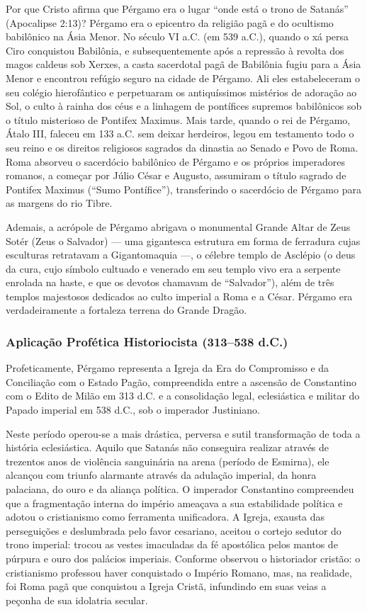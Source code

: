 \documentclass[11pt,a4paper,openany]{book}
\begin{document}
Por que Cristo afirma que Pérgamo era o lugar ``onde está o trono de Satanás'' (Apocalipse 2:13)? Pérgamo era o epicentro da religião pagã e do ocultismo babilônico na Ásia Menor. No século VI a.C. (em 539 a.C.), quando o xá persa Ciro conquistou Babilônia, e subsequentemente após a repressão à revolta dos magos caldeus sob Xerxes, a casta sacerdotal pagã de Babilônia fugiu para a Ásia Menor e encontrou refúgio seguro na cidade de Pérgamo. Ali eles estabeleceram o seu colégio hierofântico e perpetuaram os antiquíssimos mistérios de adoração ao Sol, o culto à rainha dos céus e a linhagem de pontífices supremos babilônicos sob o título misterioso de Pontifex Maximus. Mais tarde, quando o rei de Pérgamo, Átalo III, faleceu em 133 a.C. sem deixar herdeiros, legou em testamento todo o seu reino e os direitos religiosos sagrados da dinastia ao Senado e Povo de Roma. Roma absorveu o sacerdócio babilônico de Pérgamo e os próprios imperadores romanos, a começar por Júlio César e Augusto, assumiram o título sagrado de Pontifex Maximus (``Sumo Pontífice''), transferindo o sacerdócio de Pérgamo para as margens do rio Tibre.

Ademais, a acrópole de Pérgamo abrigava o monumental Grande Altar de Zeus Sotér (Zeus o Salvador) — uma gigantesca estrutura em forma de ferradura cujas esculturas retratavam a Gigantomaquia —, o célebre templo de Asclépio (o deus da cura, cujo símbolo cultuado e venerado em seu templo vivo era a serpente enrolada na haste, e que os devotos chamavam de ``Salvador''), além de três templos majestosos dedicados ao culto imperial a Roma e a César. Pérgamo era verdadeiramente a fortaleza terrena do Grande Dragão.


\subsubsection*{Aplicação Profética Historiocista (313–538 d.C.)}
Profeticamente, Pérgamo representa a Igreja da Era do Compromisso e da Conciliação com o Estado Pagão, compreendida entre a ascensão de Constantino com o Edito de Milão em 313 d.C. e a consolidação legal, eclesiástica e militar do Papado imperial em 538 d.C., sob o imperador Justiniano.

Neste período operou-se a mais drástica, perversa e sutil transformação de toda a história eclesiástica. Aquilo que Satanás não conseguira realizar através de trezentos anos de violência sanguinária na arena (período de Esmirna), ele alcançou com triunfo alarmante através da adulação imperial, da honra palaciana, do ouro e da aliança política. O imperador Constantino compreendeu que a fragmentação interna do império ameaçava a sua estabilidade política e adotou o cristianismo como ferramenta unificadora. A Igreja, exausta das perseguições e deslumbrada pelo favor cesariano, aceitou o cortejo sedutor do trono imperial: trocou as vestes imaculadas da fé apostólica pelos mantos de púrpura e ouro dos palácios imperiais. Conforme observou o historiador cristão: o cristianismo professou haver conquistado o Império Romano, mas, na realidade, foi Roma pagã que conquistou a Igreja Cristã, infundindo em suas veias a peçonha de sua idolatria secular.
\end{document}
